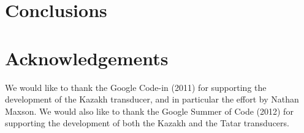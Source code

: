 \documentclass[a4paper,11pt,twocolumn]{article}
\begin{document}

\section{Conclusions}

\section*{Acknowledgements}

We would like to thank the Google Code-in (2011) for supporting the development 
of the Kazakh transducer, and in particular the effort by Nathan Maxson. We 
would also like to thank the Google Summer of Code (2012) for supporting the 
development of both the Kazakh and the Tatar transducers. 



\end{document}
